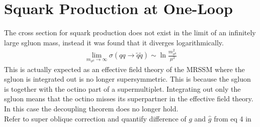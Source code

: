 \section{Squark Production at One-Loop}
The cross section for squark production does not exist in the limit of an infinitely large sgluon mass, instead it was found that it diverges logarithmically.\\
\begin{align}
\lim_{m_{\sigma^0}\to\infty} \sigma(qq \to \tilde{q}\tilde{q}) \sim \ln \frac{m_{\sigma^0}^2}{\mu^2}
\end{align}
This is actually expected as an effective field theory of the MRSSM where the sgluon is integrated out is no longer supersymmetric. This is because the sgluon is together with the octino part of a supermultiplet. Integrating out only the sgluon means that the octino misses its superpartner in the effective field theory. In this case the decoupling theorem \cite{Appelquist:1974tg} does no longer hold.\\
Refer to super oblique correction and quantify difference of $g$ and $\hat{g}$ from eq 4 in \cite{Cheng:1997sq}